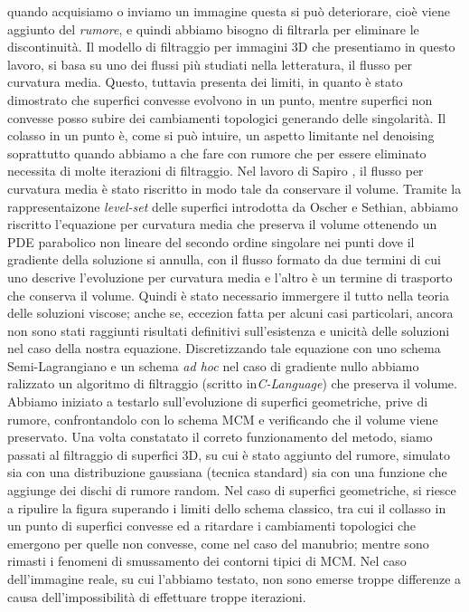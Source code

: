 quando acquisiamo o inviamo un immagine questa si può deteriorare, cioè 
viene aggiunto del \emph{rumore}, e quindi abbiamo bisogno di
filtrarla per eliminare le discontinuità. Il modello di filtraggio per
immagini 3D che presentiamo in questo lavoro, si basa su uno dei flussi più
studiati nella letteratura, il flusso per curvatura media. Questo,
tuttavia presenta dei limiti, in quanto è stato dimostrato che
superfici convesse evolvono in un punto, mentre superfici
non convesse posso subire dei cambiamenti topologici generando delle
singolarità. Il colasso in un punto è, come si può intuire, un aspetto
limitante nel denoising soprattutto quando abbiamo a che fare con
rumore che per essere eliminato necessita di molte iterazioni
di filtraggio. Nel lavoro di Sapiro \cite[][]{gui:sapiro}, il
flusso per curvatura media è stato riscritto in modo tale da
conservare il volume. Tramite la rappresentaizone 
\emph{level-set} delle superfici introdotta da Oscher e Sethian,
abbiamo riscritto l'equazione per curvatura media che preserva il
volume ottenendo un PDE parabolico non lineare del secondo ordine
singolare nei punti dove il gradiente della soluzione si annulla, con
il flusso formato da due termini di cui uno descrive l'evoluzione 
per curvatura media e l'altro è un termine di trasporto che conserva
il volume. Quindi è stato necessario immergere il tutto nella teoria
delle soluzioni viscose; anche se, eccezion fatta per alcuni casi
particolari, ancora non sono stati raggiunti risultati definitivi
sull'esistenza e unicità delle soluzioni nel caso della nostra
equazione. Discretizzando tale equazione con uno schema
Semi-Lagrangiano e un schema \emph{ad hoc} nel caso di gradiente 
nullo abbiamo ralizzato un algoritmo di filtraggio (scritto
in\emph{C-Language}) che preserva il volume. Abbiamo iniziato a
testarlo sull'evoluzione di superfici geometriche, prive di rumore,
confrontandolo con lo schema MCM e verificando che il volume viene
preservato. Una volta constatato il correto funzionamento del metodo,
siamo passati al filtraggio di superfici 3D, su cui è stato aggiunto
del rumore, simulato sia con una distribuzione gaussiana (tecnica
standard) sia con una funzione che aggiunge dei dischi di rumore
random. Nel caso di superfici geometriche, si riesce a ripulire la
figura superando i limiti dello schema classico, tra cui il collasso
in un punto di superfici convesse ed a ritardare i cambiamenti topologici che
emergono per quelle non convesse, come nel caso del manubrio; mentre
sono rimasti i fenomeni di smussamento dei contorni tipici di MCM.
Nel caso dell'immagine reale, su cui l'abbiamo testato, non sono
emerse troppe differenze a causa dell'impossibilità di effettuare troppe
iterazioni.
 
